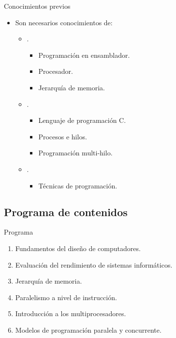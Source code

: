 \begin{frame}[t]{Conocimientos previos}
\begin{itemize}
  \item Son necesarios conocimientos de:
    \begin{itemize}

      \item {}.
        \begin{itemize}
          \item Programación en ensamblador.
          \item Procesador.
          \item Jerarquía de memoria.
        \end{itemize}

      \item {}.
        \begin{itemize}
          \item Lenguaje de programación C.
          \item Procesos e hilos.
          \item Programación multi-hilo.
        \end{itemize}

      \item {}.
        \begin{itemize}
          \item Técnicas de programación.
        \end{itemize}
    \end{itemize}
\end{itemize}
\end{frame}

\subsection{Programa de contenidos}

\begin{frame}[t]{Programa}
\begin{enumerate}
  \item Fundamentos del diseño de computadores.

  \item Evaluación del rendimiento de sistemas informáticos.

  \item Jerarquía de memoria.

  \item Paralelismo a nivel de instrucción. 

  \item Introducción a los multiprocesadores.

  \item Modelos de programación paralela y concurrente.
\end{enumerate}
\end{frame}
